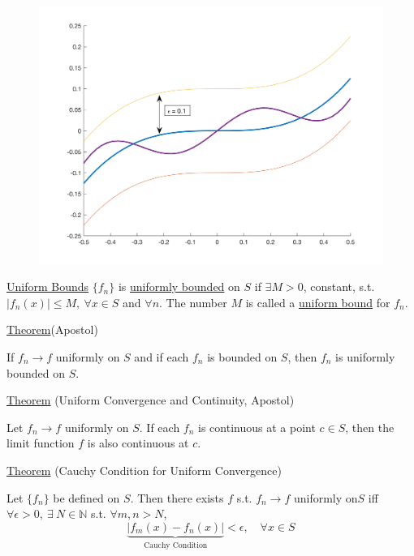 \documentclass[twoside]{article}
\begin{document}
\begin{figure}[htbp] 
    \centering
    \includegraphics[width=.8\textwidth]{figure/fig2.png}
\end{figure}

\underline{Uniform Bounds}
$\{f_n\}$ is \underline{uniformly bounded} on $S$ if $\exists M > 0$, constant, s.t. $|f_n(x)| \leq M , ~ \forall x \in S$ and $ \forall n$. The number $M$ is called a \underline{uniform bound} for $f_n$.

\underline{Theorem}(Apostol)

If $f_n \to f$ uniformly on $S$ and if each $f_n$ is bounded on $S$, then $f_n$ is uniformly bounded on $S$.

\underline{Theorem} (Uniform Convergence and Continuity, Apostol)

Let $f_n \to f$ uniformly on $S$. If each $f_n$ is continuous at a point $c \in S$, then the limit function $f$ is also continuous at $c$.

\underline{Theorem} (Cauchy Condition for Uniform Convergence)

Let $\{f_n\}$ be defined on $S$. Then there exists $f$ s.t. $f_n \to f$ uniformly on$S$ iff $\forall \epsilon >0, ~\exists~ N \in \mathbb{N}$ s.t. $\forall m,n > N$, \[
\underbrace{|f_m(x)- f_n(x)| }_{\text{Cauchy Condition}} < \epsilon, \quad \forall x \in S
\]
\end{document}
